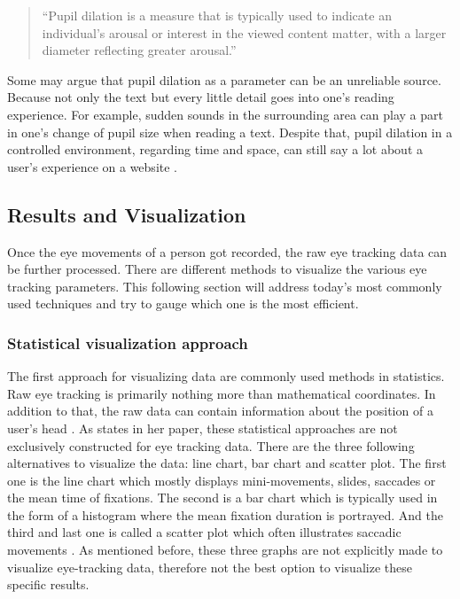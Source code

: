\begin{quote}
``Pupil dilation is a measure that is typically used to indicate an individual’s arousal or interest in the viewed content matter, with a larger diameter reflecting greater arousal.''
\autocite[3]{joachims2017accurately}
\end{quote}

Some may argue that pupil dilation as a parameter can be an unreliable source. 
Because not only the text but every little detail goes into one's reading experience. For example, sudden sounds in the surrounding area can play a part in one's change of pupil size when reading a text. 
Despite that, pupil dilation in a controlled environment, regarding time and space, can still say a lot about a user's experience on a website \autocite[]{bruneau2002eyes}.

\subsection{Results and Visualization}
\label{subsection:ResultsVisualization}
Once the eye movements of a person got recorded, the raw eye tracking data can be further processed. There are different methods to visualize the various eye tracking parameters. This following section will address today's most commonly used techniques and try to gauge which one is the most efficient.

\subsubsection{Statistical visualization approach}
The first approach for visualizing data are commonly used methods in statistics. Raw eye tracking is primarily nothing more than mathematical coordinates. In addition to that, the raw data can contain information about the position of a user's head \autocite[]{bruneau2002eyes, biedert2010eyebook, kurzhals2016gaze}. 
As \textcite[]{blascheck2014state} states in her paper, these statistical approaches are not exclusively constructed for eye tracking data. There are the three following alternatives to visualize the data: line chart, bar chart and scatter plot. The first one is the line chart which mostly displays mini-movements, slides, saccades or the mean time of fixations. The second is a bar chart which is typically used in the form of a histogram where the mean fixation duration is portrayed. And the third and last one is called a scatter plot which often illustrates saccadic movements \autocite[]{blascheck2014state}.
As mentioned before, these three graphs are not explicitly made to visualize eye-tracking data, therefore not the best option to visualize these specific results.

